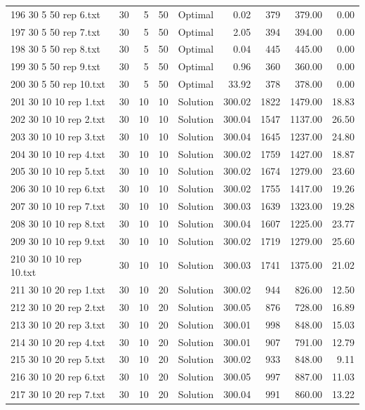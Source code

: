 \begin{longtable}{lrrllrrrr}
196 30 5 50 rep 6.txt & 30 & 5 & 50 & Optimal &  0.02 & 379 & 379.00 &  0.00\\
197 30 5 50 rep 7.txt & 30 & 5 & 50 & Optimal &  2.05 & 394 & 394.00 &  0.00\\
198 30 5 50 rep 8.txt & 30 & 5 & 50 & Optimal &  0.04 & 445 & 445.00 &  0.00\\
199 30 5 50 rep 9.txt & 30 & 5 & 50 & Optimal &  0.96 & 360 & 360.00 &  0.00\\
200 30 5 50 rep 10.txt & 30 & 5 & 50 & Optimal & 33.92 & 378 & 378.00 &  0.00\\
201 30 10 10 rep 1.txt & 30 & 10 & 10 & Solution & 300.02 & 1822 & 1479.00 & 18.83\\
202 30 10 10 rep 2.txt & 30 & 10 & 10 & Solution & 300.04 & 1547 & 1137.00 & 26.50\\
203 30 10 10 rep 3.txt & 30 & 10 & 10 & Solution & 300.04 & 1645 & 1237.00 & 24.80\\
204 30 10 10 rep 4.txt & 30 & 10 & 10 & Solution & 300.02 & 1759 & 1427.00 & 18.87\\
205 30 10 10 rep 5.txt & 30 & 10 & 10 & Solution & 300.02 & 1674 & 1279.00 & 23.60\\
206 30 10 10 rep 6.txt & 30 & 10 & 10 & Solution & 300.02 & 1755 & 1417.00 & 19.26\\
207 30 10 10 rep 7.txt & 30 & 10 & 10 & Solution & 300.03 & 1639 & 1323.00 & 19.28\\
208 30 10 10 rep 8.txt & 30 & 10 & 10 & Solution & 300.04 & 1607 & 1225.00 & 23.77\\
209 30 10 10 rep 9.txt & 30 & 10 & 10 & Solution & 300.02 & 1719 & 1279.00 & 25.60\\
210 30 10 10 rep 10.txt & 30 & 10 & 10 & Solution & 300.03 & 1741 & 1375.00 & 21.02\\
211 30 10 20 rep 1.txt & 30 & 10 & 20 & Solution & 300.02 & 944 & 826.00 & 12.50\\
212 30 10 20 rep 2.txt & 30 & 10 & 20 & Solution & 300.05 & 876 & 728.00 & 16.89\\
213 30 10 20 rep 3.txt & 30 & 10 & 20 & Solution & 300.01 & 998 & 848.00 & 15.03\\
214 30 10 20 rep 4.txt & 30 & 10 & 20 & Solution & 300.01 & 907 & 791.00 & 12.79\\
215 30 10 20 rep 5.txt & 30 & 10 & 20 & Solution & 300.02 & 933 & 848.00 &  9.11\\
216 30 10 20 rep 6.txt & 30 & 10 & 20 & Solution & 300.05 & 997 & 887.00 & 11.03\\
217 30 10 20 rep 7.txt & 30 & 10 & 20 & Solution & 300.04 & 991 & 860.00 & 13.22\\

\end{longtable}
